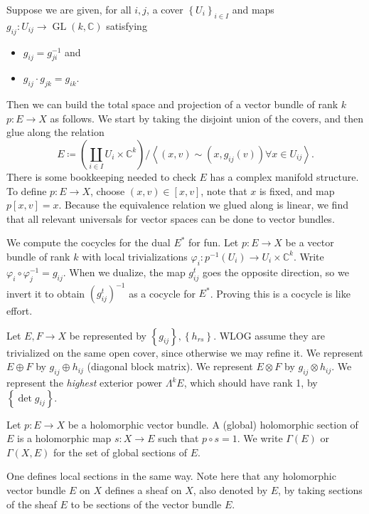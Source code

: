 Suppose we are given, for all $i,j$, a cover $\left\{ U_i \right\} _{i\in I} $ and maps $g_{ij} : U_{ij}  \to \operatorname{GL} (k,\mathbb{C} )$ satisfying
\begin{itemize}
	\item $g_{ij} =g_{ji} ^{-1} $ and
	\item $g_{ij} \cdot g_{jk} =g_{ik} $.
\end{itemize}
Then we can build the total space and projection of a vector bundle of rank $k$ $p : E \to X$ as follows. We start by taking the disjoint union of the covers, and then glue along the relation
\[
	E\coloneqq \left( \coprod_{i\in I} U_i\times \mathbb{C} ^k \right) / \left\langle (x,v)\sim (x,g_{ij} (v)) \forall x\in U_{ij}  \right\rangle 
.\]
There is some bookkeeping needed to check $E$ has a complex manifold structure. To define $p : E \to X$, choose $(x,v)\in[x,v]$, note that $x$ is fixed, and map $p[x,v]=x$. Because the equivalence relation we glued along is linear, we find that all relevant universals for vector spaces can be done to vector bundles.

We compute the cocycles for the dual $E^*$ for fun. Let $p : E \to X$ be a vector bundle of rank $k$ with local trivializations $\varphi _i : p ^{-1} (U_i) \to U_i\times \mathbb{C} ^k$. Write $\varphi _i \circ \varphi _j ^{-1} =g_{ij} $. When we dualize, the map $g_{ij} ^t$ goes the opposite direction, so we invert it to obtain $(g_{ij} ^t)^{-1} $ as a cocycle for $E^*$. Proving this is a cocycle is like effort.

Let $E,F\to X$ be represented by $\left\{ g_{ij}  \right\} ,\left\{ h_{rs}  \right\} $. WLOG assume they are trivialized on the same open cover, since otherwise we may refine it. We represent $E\oplus F$ by $g_{ij} \oplus h_{ij} $ (diagonal block matrix). We represent $E\otimes F$ by $g_{ij} \otimes h_{ij} $. We represent the \emph{highest} exterior power $\Lambda ^kE$, which should have rank 1, by $\left\{ \det g_{ij}  \right\} $.

\begin{definition}\label{ashj}
	Let $p : E \to X$ be a holomorphic vector bundle. A (global) holomorphic section of $E$ is a holomorphic map $s : X \to E$ such that $p\circ s=1$. We write $\Gamma (E)$ or $\Gamma (X,E)$ for the set of global sections of $E$.
\end{definition}

One defines local sections in the same way. Note here that any holomorphic vector bundle $E$ on $X$ defines a sheaf on $X$, also denoted by $E$, by taking sections of the sheaf $E$ to be sections of the vector bundle $E$.

